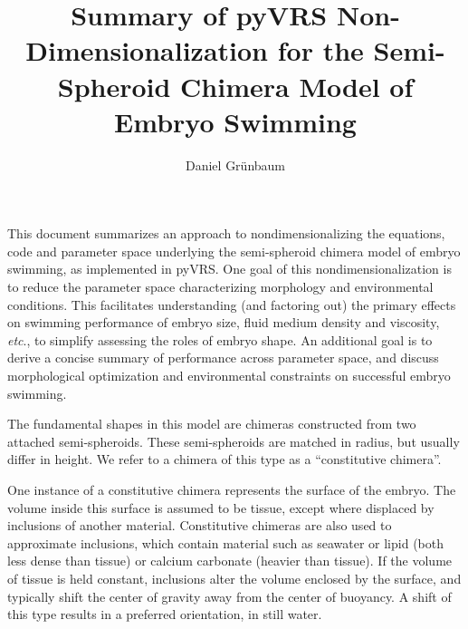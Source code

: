 \documentclass[10pt,a4paper]{article}
\title{Summary of pyVRS Non-Dimensionalization for the Semi-Spheroid Chimera Model of Embryo Swimming}
\author{Daniel Gr\"unbaum}
\def\etc{\emph{etc}.\xspace}
\begin{document}
\maketitle
This document summarizes an approach to nondimensionalizing the equations, code and parameter space underlying the semi-spheroid chimera model of embryo swimming, as implemented in pyVRS. 
One goal of this nondimensionalization is to reduce the parameter space characterizing morphology and environmental conditions. 
This facilitates understanding (and factoring out) the primary effects on swimming performance of embryo size, fluid medium density and viscosity, \etc, to simplify assessing the roles of embryo shape.
An additional goal is to derive a concise summary of performance across parameter space, and discuss morphological optimization and environmental constraints on successful embryo swimming.

The fundamental shapes in this model are chimeras constructed from two attached semi-spheroids. These semi-spheroids are matched in radius, but usually differ in height. 
We refer to a chimera of this type as a ``constitutive chimera''.

One instance of a constitutive chimera represents the surface of the embryo.
The volume inside this surface is assumed to be tissue, except where displaced by inclusions of another material. 
Constitutive chimeras are also used to approximate inclusions, which contain material such as seawater or lipid (both less dense than tissue) or calcium carbonate (heavier than tissue).
If the volume of tissue is held constant, inclusions alter the volume enclosed by the surface, and typically shift the center of gravity away from the center of buoyancy.
A shift of this type results in a preferred orientation, in still water.
\end{document}
